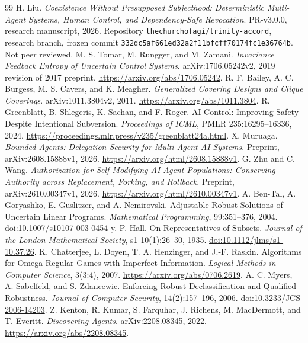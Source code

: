 \documentclass[11pt,a4paper]{article}
\theoremstyle{definition}\newtheorem{definition}{Definition}
\begin{document}
\begin{thebibliography}{99}\small
{} H. Liu. \emph{Coexistence Without Presupposed Subjecthood: Deterministic Multi-Agent Systems, Human Control, and Dependency-Safe Revocation}. PR-v3.0.0, research manuscript, 2026. Repository \texttt{thechurchofagi/trinity-accord}, research branch, frozen commit \nolinkurl{332dc5af661ed32a2f11bfcff70174fc1e36764b}. Not peer reviewed.
 M. S. Tomar, M. Rungger, and M. Zamani. \emph{Invariance Feedback Entropy of Uncertain Control Systems}. arXiv:1706.05242v2, 2019 revision of 2017 preprint. \url{https://arxiv.org/abs/1706.05242}.
 R. F. Bailey, A. C. Burgess, M. S. Cavers, and K. Meagher. \emph{Generalized Covering Designs and Clique Coverings}. arXiv:1011.3804v2, 2011. \url{https://arxiv.org/abs/1011.3804}.
 R. Greenblatt, B. Shlegeris, K. Sachan, and F. Roger. AI Control: Improving Safety Despite Intentional Subversion. \emph{Proceedings of ICML}, PMLR 235:16295--16336, 2024. \url{https://proceedings.mlr.press/v235/greenblatt24a.html}.
 X. Muruaga. \emph{Bounded Agents: Delegation Security for Multi-Agent AI Systems}. Preprint, arXiv:2608.15888v1, 2026. \url{https://arxiv.org/html/2608.15888v1}.
 G. Zhu and C. Wang. \emph{Authorization for Self-Modifying AI Agent Populations: Conserving Authority across Replacement, Forking, and Rollback}. Preprint, arXiv:2610.00347v1, 2026. \url{https://arxiv.org/html/2610.00347v1}.
 A. Ben-Tal, A. Goryashko, E. Guslitzer, and A. Nemirovski. Adjustable Robust Solutions of Uncertain Linear Programs. \emph{Mathematical Programming}, 99:351--376, 2004. \href{https://doi.org/10.1007/s10107-003-0454-y}{doi:10.1007/s10107-003-0454-y}.
 P. Hall. On Representatives of Subsets. \emph{Journal of the London Mathematical Society}, s1-10(1):26--30, 1935. \href{https://doi.org/10.1112/jlms/s1-10.37.26}{doi:10.1112/jlms/s1-10.37.26}.
 K. Chatterjee, L. Doyen, T. A. Henzinger, and J.-F. Raskin. Algorithms for Omega-Regular Games with Imperfect Information. \emph{Logical Methods in Computer Science}, 3(3:4), 2007. \url{https://arxiv.org/abs/0706.2619}.
 A. C. Myers, A. Sabelfeld, and S. Zdancewic. Enforcing Robust Declassification and Qualified Robustness. \emph{Journal of Computer Security}, 14(2):157--196, 2006. \href{https://doi.org/10.3233/JCS-2006-14203}{doi:10.3233/JCS-2006-14203}.
 Z. Kenton, R. Kumar, S. Farquhar, J. Richens, M. MacDermott, and T. Everitt. \emph{Discovering Agents}. arXiv:2208.08345, 2022. \url{https://arxiv.org/abs/2208.08345}.

\end{thebibliography}
\end{document}
